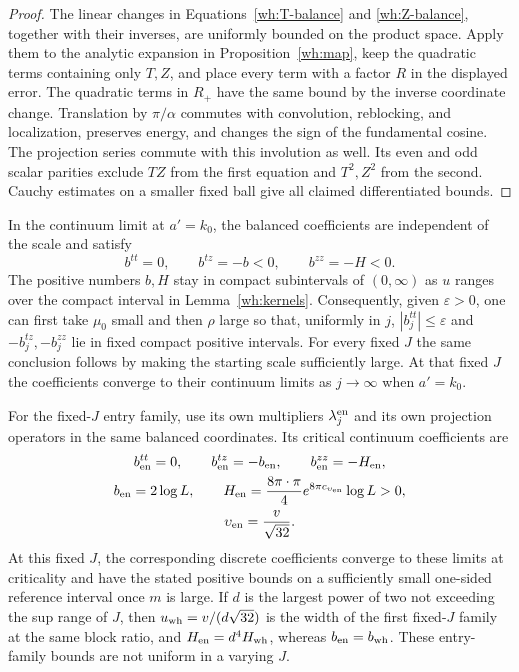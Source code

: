 \begin{proof}
The linear changes in Equations~\eqref{wh:T-balance} and
\eqref{wh:Z-balance}, together with their inverses, are uniformly
bounded on the product space.  Apply them to the analytic expansion
in Proposition~\ref{wh:map}, keep the quadratic terms containing
only $T,Z$, and place every term with a factor $R$ in the displayed
error.  The quadratic terms in $R_+$ have the same bound by the
inverse coordinate change.  Translation by $\pi/\alpha$ commutes
with convolution, reblocking, and localization, preserves energy,
and changes the sign of the fundamental cosine.  The projection
series commute with this involution as well.  Its even and odd
scalar parities exclude $TZ$ from the first equation and $T^2,Z^2$
from the second.  Cauchy estimates on a smaller fixed ball give all
claimed differentiated bounds.
\end{proof}

\begin{proposition}\label{wh:quadratic-coefficients}
In the continuum limit at $a'=k_0$, the balanced coefficients are
independent of the scale and satisfy
\begin{equation}\label{wh:coefficient-signs}
 b^{tt}=0,\qquad b^{tz}=-b<0,\qquad b^{zz}=-H<0.
\end{equation}
The positive numbers $b,H$ stay in compact subintervals of
$(0,\infty)$ as $u$ ranges over the compact interval in
Lemma~\ref{wh:kernels}.  Consequently, given $\varepsilon>0$, one
can first take $\mu_0$ small and then $\rho$ large so that, uniformly
in $j$, $|b_j^{tt}|\le\varepsilon$ and $-b_j^{tz},-b_j^{zz}$ lie in
fixed compact positive intervals.  For every fixed $J$ the same
conclusion follows by making the starting scale sufficiently large.
At that fixed $J$ the coefficients converge to their continuum
limits as $j\to\infty$ when $a'=k_0$.

For the fixed-$J$ entry family, use its own multipliers
$\lambda_j^{\rm en}$ and its own projection operators in the same
balanced coordinates.  Its critical continuum coefficients are
\[
\begin{gathered}
 b_{\rm en}^{tt}=0,\qquad b_{\rm en}^{tz}=-b_{\rm en},
 \qquad b_{\rm en}^{zz}=-H_{\rm en},\\
 b_{\rm en}=2\log L,\qquad
 H_{\rm en}=\frac{8\pi\cdot\pi}{4}
       e^{8\pi c_{\upsilon_{\rm en}}}\log L>0,\\
 \upsilon_{\rm en}=\frac{v}{\sqrt{32}}.
\end{gathered}
\]
At this fixed $J$, the corresponding discrete coefficients converge
to these limits at criticality and have the stated positive bounds
on a sufficiently small one-sided reference interval once $m$ is
large.  If $d$ is the largest power of two not exceeding the sup
range of $J$, then $u_{\rm wh}=v/(d\sqrt{32})$ is the width of
the first fixed-$J$ family at the same block ratio, and
$H_{\rm en}=d^4H_{\rm wh}$, whereas $b_{\rm en}=b_{\rm wh}$.
These entry-family bounds are not uniform in a varying $J$.
\end{proposition}

